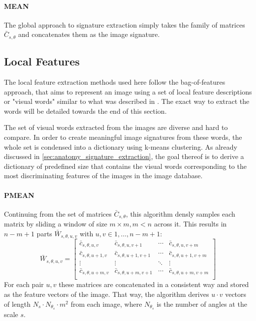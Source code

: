 \paragraph{MEAN}

The global approach to signature extraction simply takes the family of matrices
$\bar{C}_{s, \theta}$ and concatenates them as the image signature.

\subsection{Local Features}

The local feature extraction methods used here follow the bag-of-features
approach, that aims to represent an image using a set of local feature
descriptions or "visual words" similar to what was described in
\autocite{sivic_video_2003}. The exact way to extract the words will be
detailed towards the end of this section.

The set of visual words extracted from the images are diverse and hard to
compare. In order to create meaningful image signatures from these words, the
whole set is condensed into a dictionary using k-means clustering. As already
discussed in \ref{sec:anatomy_signature_extraction}, the goal thereof is to
derive a dictionary of predefined size that contains the visual words
corresponding to the most discriminating features of the images in the image
database.

\paragraph{PMEAN}

Continuing from the set of matrices $\bar{C}_{s, \theta}$, this algorithm
densly samples each matrix by sliding a window of size $m \times m, m < n$
across it. This results in $n - m + 1$ parts $\bar{W}_{s, \theta, u, v}$ with
$u, v \in 1, \dots, n - m + 1$:
\begin{equation*}
    \bar{W}_{s,\theta,u,v} =
    \begin{bmatrix}
        \bar{c}_{s,\theta,u,v} & \bar{c}_{s,\theta,u,v+1} & \cdots & \bar{c}_{s,\theta,u,v+m} \\
        \bar{c}_{s,\theta,u+1,v} & \bar{c}_{s,\theta,u+1,v+1} & \cdots & \bar{c}_{s,\theta,u+1,v+m} \\
        \vdots  & \vdots  & \ddots & \vdots  \\
        \bar{c}_{s,\theta,u+m,v} & \bar{c}_{s,\theta,u+m,v+1} & \cdots & \bar{c}_{s,\theta,u+m,v+m} \\
    \end{bmatrix}
\end{equation*}
For each pair $u, v$ these matrices are concatenated in a consistent way and
stored as the feature vectors of the image. That way, the algorithm derives $u
\cdot v$ vectors of length $N_s \cdot N_{\theta_s} \cdot m^2$ from each image,
where $N_{\theta_s}$ is the number of angles at the scale $s$.

